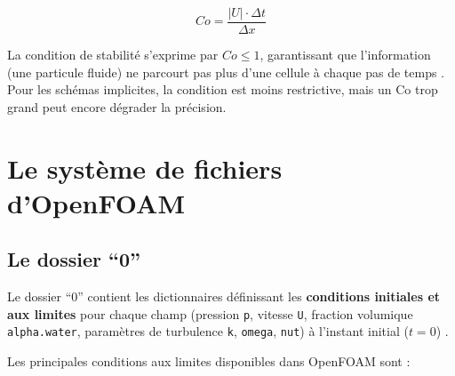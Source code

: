 \begin{equation}
Co = \frac{|U| \cdot \Delta t}{\Delta x}
\label{eq:courant}
\end{equation}

La condition de stabilité s'exprime par \( Co \leq 1 \), garantissant que l'information (une particule fluide) ne parcourt pas plus d'une cellule à chaque pas de temps \cite{trefethen1996finite}. Pour les schémas implicites, la condition est moins restrictive, mais un Co trop grand peut encore dégrader la précision.

\section{Le système de fichiers d'OpenFOAM}
\label{sec:fichiers_openfoam}

\subsection{Le dossier ``0''}
\label{subsec:dossier_0}

Le dossier ``0'' contient les dictionnaires définissant les \textbf{conditions initiales et aux limites} pour chaque champ (pression \texttt{p}, vitesse \texttt{U}, fraction volumique \texttt{alpha.water}, paramètres de turbulence \texttt{k}, \texttt{omega}, \texttt{nut}) à l'instant initial ($t=0$) \cite{moukalled2016finite}.

Les principales conditions aux limites disponibles dans OpenFOAM sont \cite{openfoam2022boundary} :

